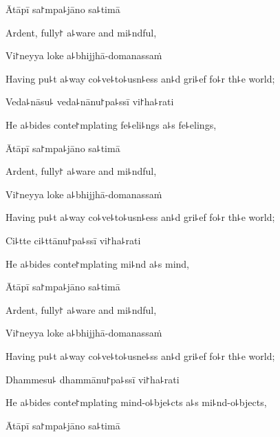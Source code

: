 Ātāpī sa꜓mpa꜕jāno sa꜕timā

\begin{english}
  Ardent, fully꜓ a꜕ware and mi꜕ndful,
\end{english}

Vi꜓neyya loke a꜕bhijjhā-domanassaṁ

\begin{english}
  Having pu꜕t a꜕way co꜕ve꜕to꜕usn꜕ess an꜕d gri꜕ef fo꜕r th꜕e world;
\end{english}

Veda꜕nāsu꜕ veda꜕nānu꜓pa꜕ssī vi꜓ha꜕rati

\begin{english}
  He a꜕bides conte꜓mplating fe꜕eli꜕ngs a꜕s fe꜕elings,
\end{english}

\ifaivedition
\clearpage
\fi

Ātāpī sa꜓mpa꜕jāno sa꜕timā

\begin{english}
  Ardent, fully꜓ a꜕ware and mi꜕ndful,
\end{english}

Vi꜓neyya loke a꜕bhijjhā-domanassaṁ

\begin{english}
  Having pu꜕t a꜕way co꜕ve꜕to꜕usn꜕ess an꜕d gri꜕ef fo꜕r th꜕e world;
\end{english}

Ci꜕tte ci꜕ttānu꜓pa꜕ssī vi꜓ha꜕rati

\begin{english}
  He a꜕bides conte꜓mplating mi꜕nd a꜕s mind,
\end{english}

Ātāpī sa꜓mpa꜕jāno sa꜕timā

\begin{english}
  Ardent, fully꜓ a꜕ware and mi꜕ndful,
\end{english}

Vi꜓neyya loke a꜕bhijjhā-domanassaṁ

\begin{english}
  Having pu꜕t a꜕way co꜕ve꜕to꜕usne꜕ss an꜕d gri꜕ef fo꜕r th꜕e world;
\end{english}

Dhammesu꜕ dhammānu꜓pa꜕ssī vi꜓ha꜕rati

\begin{english}
  He a꜕bides conte꜓mplating mind-o꜕bje꜕cts a꜕s mi꜕nd-o꜕bjects,
\end{english}

Ātāpī sa꜓mpa꜕jāno sa꜕timā

